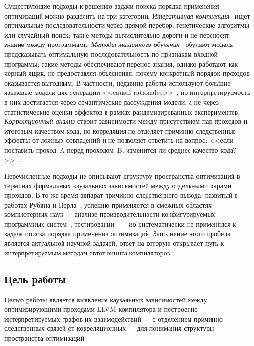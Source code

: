 Существующие подходы к решению задачи поиска порядка применения оптимизаций можно разделить на три категории. \emph{Итеративная компиляция}~\cite{cooper1999genetic, almagor2004finding} ищет оптимальные последовательности через прямой перебор, генетические алгоритмы или случайный поиск; такие методы вычислительно дороги и не переносят знание между программами. \emph{Методы машинного обучения}~\cite{ashouri2018survey, fursin2011milepost, hajali2020phd, liang2023learning, trofin2021mlgo, pan2026ecco} обучают модель предсказывать оптимальную последовательность по признакам входной программы; такие методы обеспечивают перенос знания, однако работают как чёрный ящик, не предоставляя объяснения, почему конкретный порядок проходов оказывается выгодным. В частности, недавние работы используют большие языковые модели для генерации <<causal rationales>>~\cite{pan2026ecco}, но интерпретируемость в них достигается через семантические рассуждения модели, а не через статистические оценки эффектов в рамках рандомизированных экспериментов. \emph{Корреляционный анализ} строит зависимости между присутствием пар проходов и итоговым качеством кода, но корреляция не отделяет причинно-следственные эффекты от ложных совпадений и не позволяет ответить на вопрос: <<если поставить проход~A перед проходом~B, изменится ли среднее качество кода?>>~\cite{pearl2018book}.

Перечисленные подходы не описывают структуру пространства оптимизаций в терминах формальных каузальных зависимостей между отдельными парами проходов. В то же время аппарат причинно-следственного вывода, развитый в работах Рубина и Перла~\cite{rubin1974, pearl2009causality, pearl2009overview, imbens2015causal}, успешно применяется в смежных областях компьютерных наук --- анализе производительности конфигурируемых программных систем~\cite{iqbal2022unicorn, dubslaff2022causality}, тестировании~\cite{johnson2020causal} --- но систематически не применялся к задаче поиска порядка применения оптимизаций. Заполнение этого пробела является актуальной научной задачей, ответ на которую открывает путь к интерпретируемым методам автотюнинга компиляторов.

\subsection{Цель работы}

Целью работы является выявление каузальных зависимостей между оптимизирующими проходами LLVM-компилятора и построение интерпретируемых графов их взаимодействий --- с отделением причинно-следственных связей от корреляционных --- для понимания структуры пространства оптимизаций.

